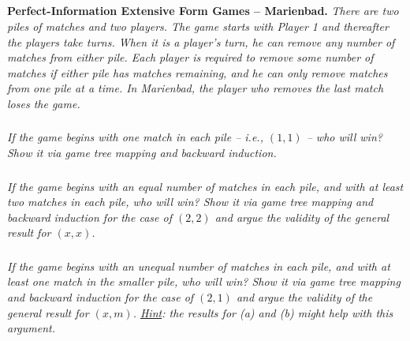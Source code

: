 \documentclass[12pt]{amsart}
\begin{document}
\subsection{}
\textbf{Perfect-Information Extensive Form Games – Marienbad.}\textit{ There are two piles of matches
	and two players. The game starts with Player 1 and thereafter the players take turns.
	When it is a player’s turn, he can remove any number of matches from either pile. Each
	player is required to remove some number of matches if either pile has matches remaining,
	and he can only remove matches from one pile at a time. In Marienbad, the player who
	removes the last match loses the game.}

\subsubsection{}
\textit{If the game begins with one match in each pile – i.e., $(1,1)$ – who will win? Show it via
	game tree mapping and backward induction.}

\subsubsection{}
\textit{If the game begins with an equal number of matches in each pile, and with at least two
	matches in each pile, who will win? Show it via game tree mapping and backward
	induction for the case of $(2,2)$ and argue the validity of the general result for $(x, x)$.}

\subsubsection{}
\textit{If the game begins with an unequal number of matches in each pile, and with at least
	one match in the smaller pile, who will win? Show it via game tree mapping and
	backward induction for the case of $(2,1)$ and argue the validity of the general result for
	$(x, m)$. \underline{Hint}: the results for (a) and (b) might help with this argument.}


\end{document}
